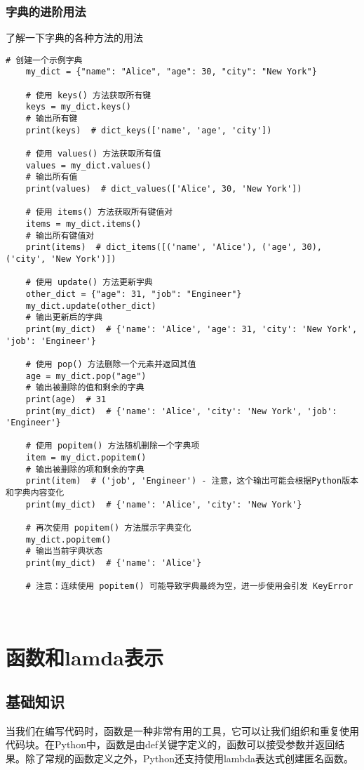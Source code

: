 \documentclass{article}
\begin{document}
\subsubsection{字典的进阶用法}
了解一下字典的各种方法的用法
\begin{lstlisting}[caption={示例Python代码}]
    # 创建一个示例字典
    my_dict = {"name": "Alice", "age": 30, "city": "New York"}
    
    # 使用 keys() 方法获取所有键
    keys = my_dict.keys()
    # 输出所有键
    print(keys)  # dict_keys(['name', 'age', 'city'])
    
    # 使用 values() 方法获取所有值
    values = my_dict.values()
    # 输出所有值
    print(values)  # dict_values(['Alice', 30, 'New York'])
    
    # 使用 items() 方法获取所有键值对
    items = my_dict.items()
    # 输出所有键值对
    print(items)  # dict_items([('name', 'Alice'), ('age', 30), ('city', 'New York')])
    
    # 使用 update() 方法更新字典
    other_dict = {"age": 31, "job": "Engineer"}
    my_dict.update(other_dict)
    # 输出更新后的字典
    print(my_dict)  # {'name': 'Alice', 'age': 31, 'city': 'New York', 'job': 'Engineer'}
    
    # 使用 pop() 方法删除一个元素并返回其值
    age = my_dict.pop("age")
    # 输出被删除的值和剩余的字典
    print(age)  # 31
    print(my_dict)  # {'name': 'Alice', 'city': 'New York', 'job': 'Engineer'}
    
    # 使用 popitem() 方法随机删除一个字典项
    item = my_dict.popitem()
    # 输出被删除的项和剩余的字典
    print(item)  # ('job', 'Engineer') - 注意，这个输出可能会根据Python版本和字典内容变化
    print(my_dict)  # {'name': 'Alice', 'city': 'New York'}
    
    # 再次使用 popitem() 方法展示字典变化
    my_dict.popitem()
    # 输出当前字典状态
    print(my_dict)  # {'name': 'Alice'}
    
    # 注意：连续使用 popitem() 可能导致字典最终为空，进一步使用会引发 KeyError



    \end{lstlisting}
\section{函数和lamda表示}
\subsection{基础知识}
当我们在编写代码时，函数是一种非常有用的工具，它可以让我们组织和重复使用代码块。在Python中，函数是由def关键字定义的，函数可以接受参数并返回结果。除了常规的函数定义之外，Python还支持使用lambda表达式创建匿名函数。
\end{document}

